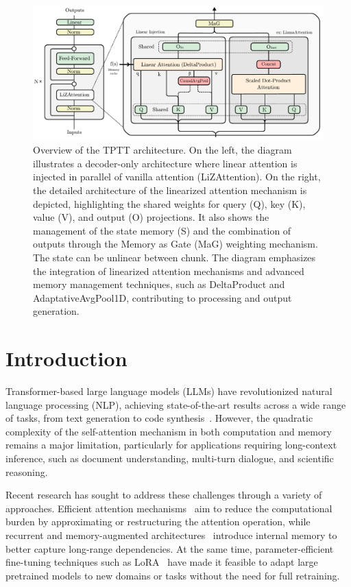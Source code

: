 \documentclass[10pt,a4paper]{article}
\begin{document}
\begin{figure}[ht]
    \centering
    \includegraphics[width=0.8\linewidth]{fig.pdf}
    \caption{Overview of the TPTT architecture. On the left, the diagram illustrates a decoder-only architecture where linear attention is injected in parallel of vanilla attention (LiZAttention). On the right, the detailed architecture of the linearized attention mechanism is depicted, highlighting the shared weights for query (Q), key (K), value (V), and output (O) projections. It also shows the management of the state memory (S) and the combination of outputs through the Memory as Gate (MaG) weighting mechanism. The state can be unlinear between chunk. The diagram emphasizes the integration of linearized attention mechanisms and advanced memory management techniques, such as DeltaProduct and AdaptativeAvgPool1D, contributing to processing and output generation.}
    \label{fig:approach_overview}
\end{figure}


\section{Introduction}

Transformer-based large language models (LLMs) have revolutionized natural language processing (NLP), achieving state-of-the-art results across a wide range of tasks, from text generation to code synthesis~\cite{vaswani2017attention, mann2020language}. However, the quadratic complexity of the self-attention mechanism in both computation and memory remains a major limitation, particularly for applications requiring long-context inference, such as document understanding, multi-turn dialogue, and scientific reasoning.

Recent research has sought to address these challenges through a variety of approaches. Efficient attention mechanisms~\cite{katharopoulos2020transformers, yang2024parallelizing} aim to reduce the computational burden by approximating or restructuring the attention operation, while recurrent and memory-augmented architectures~\cite{mercat2024linearizing, behrouz2024titans} introduce internal memory to better capture long-range dependencies. At the same time, parameter-efficient fine-tuning techniques such as LoRA~\cite{hu2022lora} have made it feasible to adapt large pretrained models to new domains or tasks without the need for full retraining.
\end{document}
